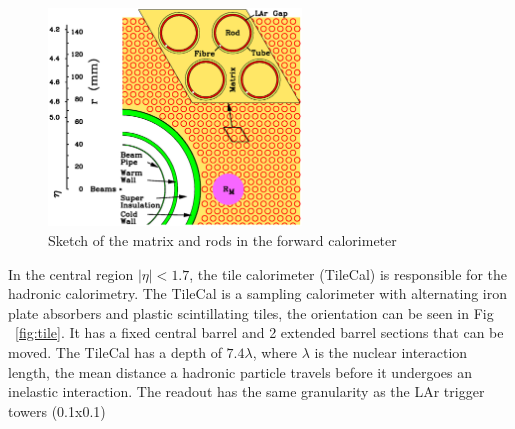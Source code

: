 \begin{figure}[h]
\begin{center}
\includegraphics*[width=0.60\textwidth] {figures/figure1-9}%
\caption[Sketch of the matrix and rods in the forward calorimeter]{Sketch of the matrix and rods in the forward calorimeter}
\label{fig:LAr_forward}
\end{center}
\end{figure}


\indent In the central region ${|\eta{}|<1.7}$, the tile calorimeter (TileCal) is responsible for the hadronic calorimetry. The TileCal is a sampling calorimeter with alternating iron plate absorbers and plastic scintillating tiles, the orientation can be seen in Fig ~\ref{fig:tile}. It has a fixed central barrel and 2 extended barrel sections that can be moved. The TileCal has a depth of ${7.4\lambda{}}$, where ${\lambda{}}$ is the nuclear interaction length, the mean distance a hadronic particle travels before it undergoes an inelastic interaction. The readout has the same granularity as the LAr trigger towers (0.1x0.1)

